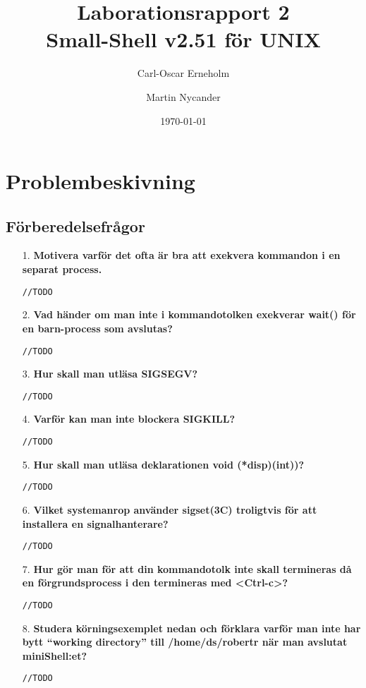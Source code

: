 \documentclass[a4paper,10pt,titlepage]{article}
\title{Laborationsrapport 2 \\ Small-Shell v2.51 för UNIX}
\author{Carl-Oscar Erneholm \and Martin Nycander}
\date{\today}
\begin{document}


\maketitle

\tableofcontents
\thispagestyle{empty}
\newpage
\setcounter{page}{1}
\section{Problembeskivning}

\subsection{Förberedelsefrågor}


\begin{enumerate}
	\item[1.] \textbf{\footnotesize Motivera varför det ofta är bra att exekvera kommandon i en separat process.}
	
	\verb!//TODO!

	\item[2.] \textbf{\footnotesize Vad händer om man inte i kommandotolken exekverar wait() för en barn-process som avslutas?}
	
	\verb!//TODO!


	\item[3.] \textbf{\footnotesize Hur skall man utläsa SIGSEGV?}
	
	\verb!//TODO!


	\item[4.] \textbf{\footnotesize Varför kan man inte blockera SIGKILL?}
	
	\verb!//TODO!


	\item[5.] \textbf{\footnotesize Hur skall man utläsa deklarationen void (*disp)(int))?}
	
	\verb!//TODO!


	\item[6.] \textbf{\footnotesize Vilket systemanrop använder sigset(3C) troligtvis för att installera en signalhanterare?}
	
	\verb!//TODO!


	\item[7.] \textbf{\footnotesize Hur gör man för att din kommandotolk inte skall termineras då en förgrundsprocess i den termineras med <Ctrl-c>?}
	
	\verb!//TODO!


	\item[8.] \textbf{\footnotesize Studera körningsexemplet nedan och förklara varför man inte har bytt “working directory” till /home/ds/robertr när man avslutat miniShell:et?}
	
	\verb!//TODO!

\end{enumerate}
\end{document}
